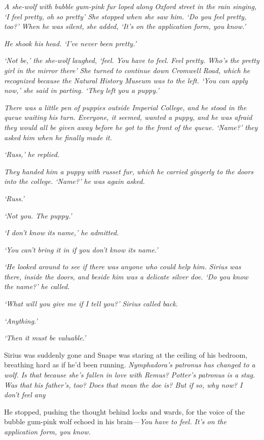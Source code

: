 \sbreak

\emph{A she-wolf with bubble gum-pink fur loped along Oxford street in the rain singing, `I feel pretty, oh so pretty{\el}' She stopped when she saw him. `Do you feel pretty, too?' When he was silent, she added, `It's on the application form, you know.'}

\emph{He shook his head. `I've never been pretty.'}

\emph{`Not be,' the she-wolf laughed, `feel. You have to feel. Feel pretty. Who's the pretty girl in the mirror there{\el}' She turned to continue down Cromwell Road, which he recognized because the Natural History Museum was to the left. `You can apply now,' she said in parting. `They left you a puppy.'}

\emph{There was a little pen of puppies outside Imperial College, and he stood in the queue waiting his turn. Everyone, it seemed, wanted a puppy, and he was afraid they would all be given away before he got to the front of the queue. `Name?' they asked him when he finally made it.}

\emph{`Russ,' he replied.}

\emph{They handed him a puppy with russet fur, which he carried gingerly to the doors into the college. `Name?' he was again asked.}

\emph{`Russ.'}

\emph{`Not you. The puppy.'}

\emph{`I don't know its name,' he admitted.}

\emph{`You can't bring it in if you don't know its name.'}

\emph{`He looked around to see if there was anyone who could help him. Sirius was there, inside the doors, and beside him was a delicate silver doe. `Do you know the name?' he called.}

\emph{`What will you give me if I tell you?' Sirius called back.}

\emph{`Anything.'}

\emph{`Then it must be valuable.'}

Sirius was suddenly gone and Snape was staring at the ceiling of his bedroom, breathing hard as if he'd been running. \emph{Nymphadora's patronus has changed to a wolf. Is that because she's fallen in love with Remus? Potter's patronus is a stag. Was that his father's, too? Does that mean the doe is{\el}? But if so, why now? I don't feel any{\el}}

He stopped, pushing the thought behind locks and wards, for the voice of the bubble gum-pink wolf echoed in his brain—\emph{You have to feel. It's on the application form, you know.} 


